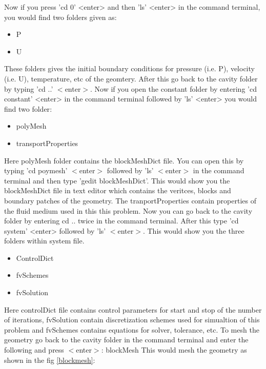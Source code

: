 \documentclass[a4paper,12pt]{report}
\begin{document}
\flushleft Now if you press 'cd 0' <enter> and then 'ls' <enter> in the command terminal, you would find two folders given as$:$

\begin{itemize}
  \item P
  \item U
\end{itemize}

\flushleft These folders gives the initial boundary conditions for pressure (i.e. P), velocity (i.e. U), temperature, etc of the geomtery. After this go back to the cavity folder by typing 'cd ..' $<$enter$>$.
\flushleft Now if you open the constant folder by entering 'cd constant' <enter> in the command terminal followed by 'ls' <enter> you would find two folder$:$

\begin{itemize}
  \item polyMesh
  \item transportProperties
\end{itemize}

\flushleft Here polyMesh folder contains the blockMeshDict file. You can open this by typing 'cd poymesh' $<$enter$>$ followed by 'ls' $<$enter$>$ in the command terminal and then type 'gedit blockMeshDict'. This would show you the blockMeshDict file in text editor which contains the veritces, blocks and boundary patches of the geometry. The tranportProperties contain properties of the fluid medium used in this this problem. 
\flushleft Now you can go back to the cavity folder by entering cd .. twice in the command terminal. After this type 'cd system' <enter> followed by 'ls' $<$enter$>$. This would show you the three folders within system file.
\begin{itemize}
  \item ControlDict
  \item fvSchemes
  \item fvSolution
\end{itemize}

\flushleft Here controlDict file contains control parameters for start and stop of the number of iterations, fvSolution contain discretization schemes used for simualtion of this problem and fvSchemes contains equations for solver, tolerance, etc.
\flushleft To mesh the geometry go back to the cavity folder in the command terminal and enter the following and press $<$enter$>$:
\flushleft blockMesh
\flushleft This would mesh the geometry as shown in the fig \ref{blockmesh}$:$
\end{document}
